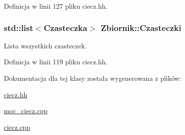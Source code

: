 Definicja w linii 127 pliku ciecz.\-hh.

\hypertarget{class_zbiornik_a751209f2f02a7eaf3b7a3283d8fcd3ad}{
\subsubsection[{Czasteczki}]{\setlength{\rightskip}{0pt plus 5cm}std\-::list$<${\bf Czasteczka}$>$ Zbiornik\-::\-Czasteczki}}\label{class_zbiornik_a751209f2f02a7eaf3b7a3283d8fcd3ad}
Lista wszystkich czasteczek. 

Definicja w linii 119 pliku ciecz.\-hh.



Dokumentacja dla tej klasy została wygenerowana z plików\-:\begin{DoxyCompactItemize}
\item 
\hyperlink{ciecz_8hh}{ciecz.\-hh}\item 
\hyperlink{moc__ciecz_8cpp}{moc\-\_\-ciecz.\-cpp}\item 
\hyperlink{ciecz_8cpp}{ciecz.\-cpp}\end{DoxyCompactItemize}
